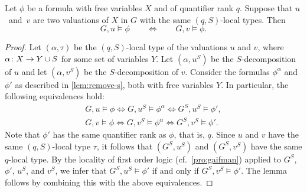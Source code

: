\begin{lemma}\label{lem:coloring}
	Let $\phi$ be a formula with
free variables $X$ and of quantifier rank $q$.
	Suppose that $u$~and~$v$ are two valuations of $X$  in $G$ with the same $(q,S)$-local types.
	Then $$G,u\models \phi\qquad \iff\qquad G,v\models \phi.$$
\end{lemma}
\begin{proof}
Let $(\alpha,\tau)$ be the $(q,S)$-local type of the valuations $u$ and $v$, where $\alpha\colon X\to Y\cup S$ for some set of variables $Y$. Let $(\alpha,u^S)$ be the $S$-decomposition of $u$
and let $(\alpha,v^S)$ be the $S$-decomposition of $v$.
	Consider the formulas $\phi^{\alpha}$ and $\phi'$ as described in \cref{lem:remove-s}, both with free variables $Y$.
	In particular, the following equivalences hold:
	\begin{align*}
	G,u\models\phi\iff G,u^S\models\phi^{\alpha}\iff G^S,u^S\models\phi',\\
	G,v\models\phi\iff G,v^S\models\phi^{\alpha}\iff G^S,v^S\models\phi'.
	\end{align*}
		Note that $\phi'$ has the same quantifier rank as  $\phi$, that is, $q$.
		Since $u$ and $ v$ have the same $(q,S)$-local type $\tau$, it follows that $(G^S,u^S)$ and $(G^S,v^S)$ have the same   $q$-local type.
		By the locality of first order logic (cf.~\cref{pro:gaifman}) applied to $G^S$, $\phi'$, $ u^S$, and $v^S$, we infer that $G^S,u^S\models\phi'$ if and only if $G^S,v^S\models\phi'$.
		The lemma follows by combining this with the above equivalences.
\end{proof}




